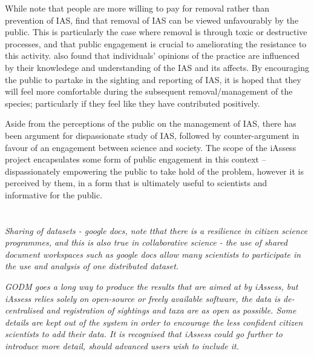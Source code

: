 \documentclass[10pt,psfig,letterpaper,twocolumn]{article}
\begin{document}
While \citet{GarciaLlorente:vx} note that people are more willing to pay for removal rather than prevention of IAS, \citet{Sharp:2011eh} find that removal of IAS can be viewed unfavourably by the public.
This is particularly the case where removal is through toxic or destructive processes, and that public engagement is crucial to ameliorating the resistance to this activity.
\citet{GarciaLlorente:vx} also found that individuals' opinions of the practice are influenced by their knowledege and understanding of the IAS and its affects.
By encouraging the public to partake in the sighting and reporting of IAS, it is hoped that they will feel more comfortable during the subsequent removal/management of the species;
particularly if they feel like they have contributed positively. 

Aside from the perceptions of the public on the management of IAS,
there has been argument \cite{Brown:2004uj} for dispassionate study of IAS,
followed by counter-argument \cite{Larson:2007vs} in favour of an engagement between science and society.
The scope of the iAssess project encapsulates some form of public engagement in this context -- dispassionately empowering the public to take hold of the problem,
however it is perceived by them, in a form that is ultimately useful to scientists and informative for the public.

\section*{}

\section*{}
\emph{Sharing of datasets - google docs, \cite{Couvet:2008gu} note tthat there is a resilience in citizen science programmes, and this is also true in collaborative science - the use of shared document workspaces such as google docs allow many scientists to participate in the use and analysis of one distributed dataset.}

\emph{GODM \cite{Graham:2007dd} goes a long way to produce the results that are aimed at by iAssess, but iAssess relies solely on open-source or freely available software, the data is de-centralised and registration of sightings and taxa are as open as possible. Some details are kept out of the system in order to encourage the less confident citizen scientists to add their data. It is recognised that iAssess could go further to introduce more detail, should advanced users wish to include it.}
\end{document}
